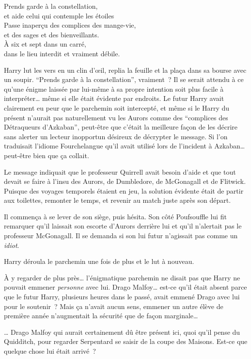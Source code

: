 \begin{writtenNote}
Prends garde à la constellation,\\
et aide celui qui contemple les étoiles
\\
Passe inaperçu des complices des mange-vie,\\
et des sages et des bienveillants.
\\
À six et sept dans un carré,\\
dans le lieu interdit et vraiment débile.
\end{writtenNote}

Harry lut les vers en un clin d'œil, replia la feuille et la plaça dans sa bourse avec un soupir.
“Prends garde à la constellation”, vraiment~?
Il se serait attendu à ce qu'une énigme laissée par lui-même à sa propre intention soit plus facile à interpréter… même si elle était évidente par endroits.
Le futur Harry avait clairement eu peur que le parchemin soit intercepté, et même si le Harry du présent n'aurait pas naturellement vu les Aurors comme des “complices des Détraqueurs d'Azkaban”, peut-être que c'était la meilleure façon de les décrire sans alerter un lecteur inopportun désireux de décrypter le message.
Si l'on traduisait l'idiome Fourchelangue qu'il avait utilisé lors de l'incident à Azkaban… peut-être bien que ça collait.

Le message indiquait que le professeur Quirrell avait besoin d'aide et que tout devait se faire à l'insu des Aurors, de Dumbledore, de McGonagall et de Flitwick.
Puisque des voyages temporels étaient en jeu, la solution évidente était de partir aux toilettes, remonter le temps, et revenir au match juste après son départ.

Il commença à se lever de son siège, puis hésita.
Son côté Poufsouffle lui fit remarquer qu'il laissait son escorte d'Aurors derrière lui et qu'il n'alertait pas le professeur McGonagall.
Il se demanda si son lui futur n'agissait pas comme un \emph{idiot}.

Harry déroula le parchemin une fois de plus et le lut à nouveau.

À y regarder de plus près… l'énigmatique parchemin ne disait pas que Harry ne pouvait emmener \emph{personne} avec lui.
Drago Malfoy… est-ce qu'il était absent parce que le futur Harry, plusieurs heures dans le passé, avait emmené Drago avec lui pour le soutenir~?
Mais ça n'avait aucun sens, emmener un autre élève de première année n'augmentait la sécurité que de façon marginale…

… Drago Malfoy qui aurait certainement dû être présent ici, quoi qu'il pense du Quidditch, pour regarder Serpentard se saisir de la coupe des Maisons.
Est-ce que quelque chose lui était arrivé~?

